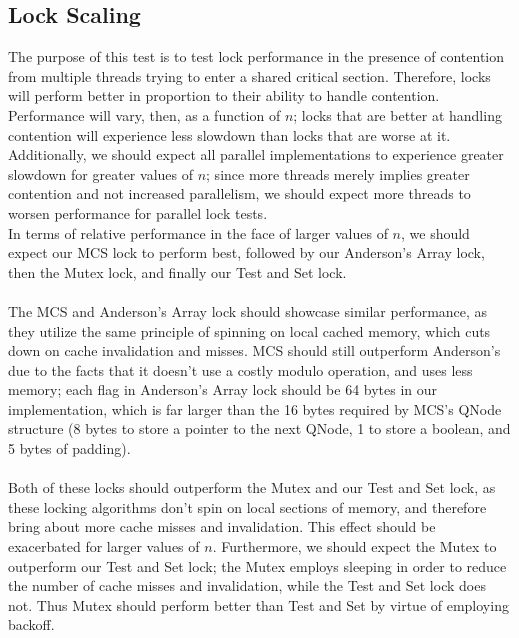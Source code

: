 \documentclass[]{article}
\begin{document}
\subsection{Lock Scaling}
The purpose of this test is to test lock performance in the presence of contention from multiple threads trying to enter a shared critical section. Therefore, locks will perform better in proportion to their ability to handle contention. Performance will vary, then, as a function of $n$; locks that are better at handling contention will experience less slowdown than locks that are worse at it. Additionally, we should expect all parallel implementations to experience greater slowdown for greater values of $n$; since more threads merely implies greater contention and not increased parallelism, we should expect more threads to worsen performance for parallel lock tests.
\\
In terms of relative performance in the face of larger values of $n$, we should expect our MCS lock to perform best, followed by our Anderson's Array lock, then the Mutex lock, and finally our Test and Set lock.
\\\\
The MCS and Anderson's Array lock should showcase similar performance, as they utilize the same principle of spinning on local cached memory, which cuts down on cache invalidation and misses. MCS should still outperform Anderson's due to the facts that it doesn't use a costly modulo operation, and uses less memory; each flag in Anderson's Array lock should be 64 bytes in our implementation, which is far larger than the 16 bytes required by MCS's QNode structure (8 bytes to store a pointer to the next QNode, 1 to store a boolean, and 5 bytes of padding).
\\\\
Both of these locks should outperform the Mutex and our Test and Set lock, as these locking algorithms don't spin on local sections of memory, and therefore bring about more cache misses and invalidation. This effect should be exacerbated for larger values of $n$. Furthermore, we should expect the Mutex to outperform our Test and Set lock; the Mutex employs sleeping in order to reduce the number of cache misses and invalidation, while the Test and Set lock does not. Thus Mutex should perform better than Test and Set by virtue of employing backoff.
\end{document}
